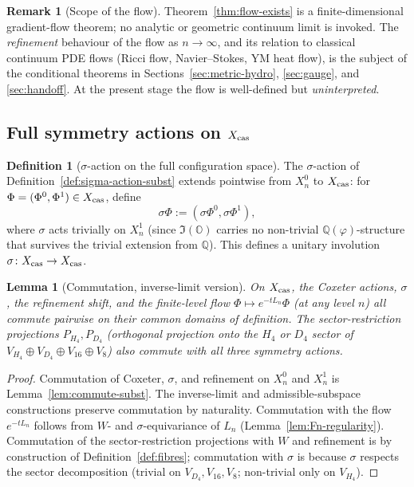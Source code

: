\documentclass[11pt, a4paper]{amsart}
\newtheorem{lemma}[theorem]{Lemma}
\theoremstyle{definition}
\newtheorem{definition}[theorem]{Definition}
\newtheorem{remark}[theorem]{Remark}
\newcommand{\Q}{\mathbb{Q}}
\newcommand{\OO}{\mathbb{O}}
\newcommand{\pphi}{\varphi}
\newcommand{\cas}{{\rm cas}}
\begin{document}
\begin{remark}[Scope of the flow]
Theorem~\ref{thm:flow-exists} is a finite-dimensional
gradient-flow theorem; no analytic or geometric continuum limit is
invoked. The \emph{refinement} behaviour of the flow as $n \to
\infty$, and its relation to classical continuum PDE flows (Ricci
flow, Navier--Stokes, YM heat flow), is the subject of the
conditional theorems in Sections~\ref{sec:metric-hydro},
\ref{sec:gauge}, and \ref{sec:handoff}. At the present stage the
flow is well-defined but \emph{uninterpreted}.
\end{remark}

\subsection{Full symmetry actions on $X_\cas$}
\label{subsec:sigma-full}

\begin{definition}[$\sigma$-action on the full configuration space]
\label{def:sigma-X-cas}
The $\sigma$-action of Definition~\ref{def:sigma-action-subst}
extends pointwise from $X_n^0$ to $X_\cas$: for
$\Phi = (\Phi^0, \Phi^1) \in X_\cas$, define
\[
  \sigma \Phi := (\sigma \Phi^0, \sigma \Phi^1),
\]
where $\sigma$ acts trivially on $X_n^1$ (since $\Im(\OO)$ carries
no non-trivial $\Q(\pphi)$-structure that survives the trivial
extension from $\Q$). This defines a unitary involution
$\sigma \colon X_\cas \to X_\cas$.
\end{definition}

\begin{lemma}[Commutation, inverse-limit version]
\label{lem:commute}
On $X_\cas$, the Coxeter actions, $\sigma$, the refinement shift,
and the finite-level flow $\Phi \mapsto e^{-tL_n}\Phi$ (at any
level $n$) all commute pairwise on their common domains of
definition. The sector-restriction projections $P_{H_4}, P_{D_4}$
(orthogonal projection onto the $H_4$ or $D_4$ sector of
$V_{H_4}\oplus V_{D_4}\oplus V_{16}\oplus V_8$) also commute with
all three symmetry actions.
\end{lemma}

\begin{proof}
Commutation of Coxeter, $\sigma$, and refinement on $X_n^0$ and
$X_n^1$ is Lemma~\ref{lem:commute-subst}. The inverse-limit and
admissible-subspace constructions preserve commutation by
naturality. Commutation with the flow $e^{-tL_n}$ follows from
$W$- and $\sigma$-equivariance of $L_n$
(Lemma~\ref{lem:Fn-regularity}). Commutation of the
sector-restriction projections with $W$ and refinement is by
construction of Definition~\ref{def:fibres}; commutation with
$\sigma$ is because $\sigma$ respects the sector decomposition
(trivial on $V_{D_4}, V_{16}, V_8$; non-trivial only on $V_{H_4}$).
\end{proof}
\end{document}
